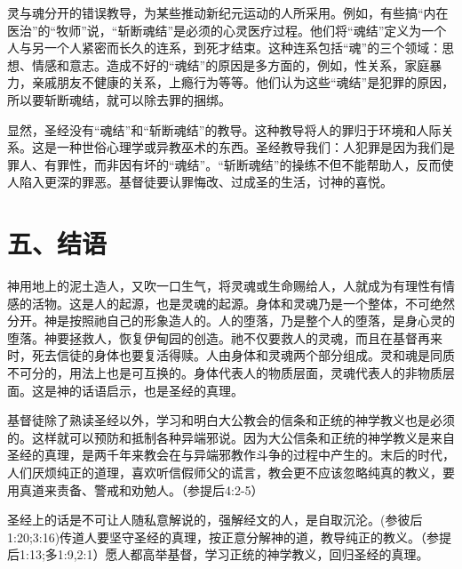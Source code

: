 灵与魂分开的错误教导，为某些推动新纪元运动的人所采用。例如，有些搞“内在医治”的“牧师”说，“斩断魂结”是必须的心灵医疗过程。他们将“魂结”定义为一个人与另一个人紧密而长久的连系，到死才结束。这种连系包括“魂”的三个领域：思想、情感和意志。造成不好的“魂结”的原因是多方面的，例如，性关系，家庭暴力，亲戚朋友不健康的关系，上瘾行为等等。他们认为这些“魂结”是犯罪的原因，所以要斩断魂结，就可以除去罪的捆绑。

显然，圣经没有“魂结”和“斩断魂结”的教导。这种教导将人的罪归于环境和人际关系。这是一种世俗心理学或异教巫术的东西。圣经教导我们：人犯罪是因为我们是罪人、有罪性，而非因有坏的“魂结”。“斩断魂结”的操练不但不能帮助人，反而使人陷入更深的罪恶。基督徒要认罪悔改、过成圣的生活，讨神的喜悦。


\section{五、结语}

神用地上的泥土造人，又吹一口生气，将灵魂或生命赐给人，人就成为有理性有情感的活物。这是人的起源，也是灵魂的起源。身体和灵魂乃是一个整体，不可绝然分开。神是按照祂自己的形象造人的。人的堕落，乃是整个人的堕落，是身心灵的堕落。神要拯救人，恢复伊甸园的创造。祂不仅要救人的灵魂，而且在基督再来时，死去信徒的身体也要复活得赎。人由身体和灵魂两个部分组成。灵和魂是同质不可分的，用法上也是可互换的。身体代表人的物质层面，灵魂代表人的非物质层面。这是神的话语启示，也是圣经的真理。

基督徒除了熟读圣经以外，学习和明白大公教会的信条和正统的神学教义也是必须的。这样就可以预防和抵制各种异端邪说。因为大公信条和正统的神学教义是来自圣经的真理，是两千年来教会在与异端邪教作斗争的过程中产生的。末后的时代，人们厌烦纯正的道理，喜欢听信假师父的谎言，教会更不应该忽略纯真的教义，要用真道来责备、警戒和劝勉人。（参提后4:2-5）

圣经上的话是不可让人随私意解说的，强解经文的人，是自取沉沦。(参彼后1:20;3:16)传道人要坚守圣经的真理，按正意分解神的道，教导纯正的教义。（参提后1:13;多1:9,2:1）愿人都高举基督，学习正统的神学教义，回归圣经的真理。

 





















